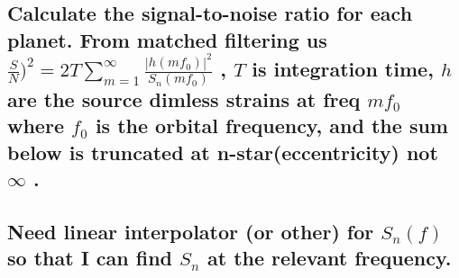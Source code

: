 \documentclass[11pt]{article}
\begin{document}
    \subsection{\texorpdfstring{Calculate the signal-to-noise ratio for each
planet. From matched filtering us
\(\frac{S}{N}\big)^2 = 2 T \sum_{m=1}^\infty \frac{|h(m f_0)|^2}{S_n(m f_0)}\)
, \(T\) is integration time, \(h\) are the source dimless strains at
freq \(m f_0\) where \(f_0\) is the orbital frequency, and the sum below
is truncated at n-star(eccentricity) not \(\infty\)
.}{Calculate the signal-to-noise ratio for each planet. From matched filtering us \textbackslash{}frac\{S\}\{N\}\textbackslash{}big)\^{}2 = 2 T \textbackslash{}sum\_\{m=1\}\^{}\textbackslash{}infty \textbackslash{}frac\{\textbar{}h(m f\_0)\textbar{}\^{}2\}\{S\_n(m f\_0)\} , T is integration time, h are the source dimless strains at freq m f\_0 where f\_0 is the orbital frequency, and the sum below is truncated at n-star(eccentricity) not \textbackslash{}infty .}}\label{calculate-the-signal-to-noise-ratio-for-each-planet.-from-matched-filtering-us-fracsnbig2-2-t-sum_m1infty-frachm-f_02s_nm-f_0-t-is-integration-time-h-are-the-source-dimless-strains-at-freq-m-f_0-where-f_0-is-the-orbital-frequency-and-the-sum-below-is-truncated-at-n-stareccentricity-not-infty-.}

    \subsection{\texorpdfstring{Need linear interpolator (or other) for
\(S_n(f)\) so that I can find \(S_n\) at the relevant
frequency.}{Need linear interpolator (or other) for S\_n(f) so that I can find S\_n at the relevant frequency.}}\label{need-linear-interpolator-or-other-for-s_nf-so-that-i-can-find-s_n-at-the-relevant-frequency.}
\end{document}
